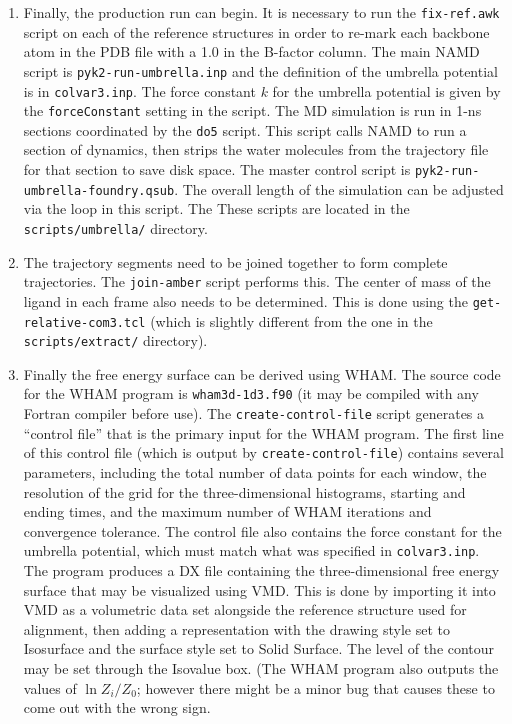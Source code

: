 \documentclass{article}      %
\begin{document}
\begin{enumerate}
\item Finally, the production run can begin.  It is necessary to run the \verb+fix-ref.awk+ script on each of the reference structures in order to re-mark each backbone atom in the PDB file with a 1.0 in the B-factor column.  The main NAMD script is \verb+pyk2-run-umbrella.inp+ and the definition of the umbrella potential is in \verb+colvar3.inp+.   The force constant $k$ for the umbrella potential is given by the \verb+forceConstant+ setting in the script.  The MD simulation is run in 1-ns sections coordinated by the \verb+do5+ script.   This script calls NAMD to run a section of dynamics, then strips the water molecules from the trajectory file for that section to save disk space.  The master control script is \verb+pyk2-run-umbrella-foundry.qsub+.  The overall length of the simulation can be adjusted via the loop in this script.   The These scripts are located in the \verb+scripts/umbrella/+ directory.
 
\item The trajectory segments need to be joined together to form complete trajectories.  The \verb+join-amber+ script performs this.  The center of mass of the ligand in each frame also needs to be determined.  This is done using the \verb+get-relative-com3.tcl+ (which is slightly different from the one in the \verb+scripts/extract/+ directory).  

\item Finally the free energy surface can be derived using WHAM.   The source code for the WHAM program is \verb+wham3d-1d3.f90+ (it may be compiled with any Fortran compiler before use).   The \verb+create-control-file+ script generates a ``control file'' that is the primary input for the WHAM program.   The first line of this control file (which is output by \verb+create-control-file+) contains several parameters, including the total number of data points for each window, the resolution of the grid for the three-dimensional histograms, starting and ending times, and the maximum number of WHAM iterations and convergence tolerance.  The control file also contains the force constant for the umbrella potential, which must match what was specified in \verb+colvar3.inp+.  The program produces a DX file containing the three-dimensional free energy surface that may be visualized using VMD.  This is done by importing it into VMD as a volumetric data set alongside the reference structure used for alignment, then adding a representation with the drawing style set to Isosurface and the surface style set to Solid Surface.  The level of the contour may be set through the Isovalue box.  (The WHAM program also outputs the values of $\ln Z_i/Z_0$; however there might be a minor bug that causes these to come out with the wrong sign.  
\end{enumerate}
\end{document}

